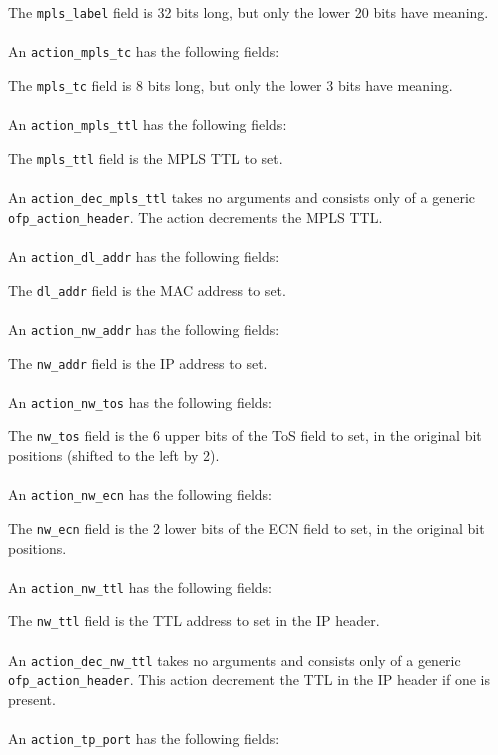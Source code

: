 
The \verb|mpls_label| field is 32 bits long, but only the lower 20 bits have meaning.
\\\\
An \verb|action_mpls_tc| has the following fields:


The \verb|mpls_tc| field is 8 bits long, but only the lower 3 bits have meaning.
\\\\
An \verb|action_mpls_ttl| has the following fields:


The \verb|mpls_ttl| field is the MPLS TTL to set.
\\\\
An \verb|action_dec_mpls_ttl| takes no arguments and consists only of a generic \verb|ofp_action_header|. The action decrements the MPLS TTL.
\\\\
An \verb|action_dl_addr| has the following fields:


The \verb|dl_addr| field is the MAC address to set.
\\\\
An \verb|action_nw_addr| has the following fields:


The \verb|nw_addr| field is the IP address to set.
\\\\
An \verb|action_nw_tos| has the following fields:


The \verb|nw_tos| field is the 6 upper bits of the ToS field to set, in the original bit positions (shifted to the left by 2).
\\\\
An \verb|action_nw_ecn| has the following fields:


The \verb|nw_ecn| field is the 2 lower bits of the ECN field to set, in the original bit positions.
\\\\
An \verb|action_nw_ttl| has the following fields:


The \verb|nw_ttl| field is the TTL address to set in the IP header.
\\\\
An \verb|action_dec_nw_ttl| takes no arguments and consists only of a generic \verb|ofp_action_header|.  This action decrement the TTL in the IP header if one is present.
\\\\
An \verb|action_tp_port| has the following fields:

